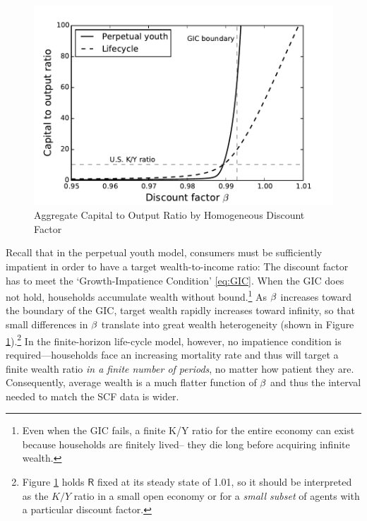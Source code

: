 \documentclass[12pt,titlepage]{econtex}
\begin{document}
\begin{figure}
  \caption{Aggregate Capital to Output Ratio by Homogeneous Discount Factor}
  \label{KYratioByBeta}
  \begin{center}
    \includegraphics{./Figures/KYratioByBeta}
  \end{center}
\end{figure}

Recall that in the perpetual youth model, consumers must be sufficiently impatient in order to have a target wealth-to-income ratio: The discount factor has to meet the `Growth-Impatience Condition' \eqref{eq:GIC}. When the GIC does not hold, households accumulate wealth without bound.\footnote{Even when the GIC fails, a finite K/Y ratio for the entire economy can exist because households are finitely lived-- they die long before acquiring infinite wealth.}  As $\beta$ increases toward the boundary of the GIC, target wealth rapidly increases toward infinity, so that small differences in $\beta$ translate into great wealth heterogeneity (shown in Figure \ref{KYratioByBeta}).\footnote{Figure \ref{KYratioByBeta} holds $\mathsf{R}$ fixed at its steady state of 1.01, so it should be interpreted as the $K/Y$ ratio in a small open economy or for a \textit{small subset} of agents with a particular discount factor.}  In the finite-horizon life-cycle model, however, no impatience condition is required---households face an increasing mortality rate and thus will target a finite wealth ratio \textit{in a finite number of periods}, no matter how patient they are. Consequently, average wealth is a much flatter function of $\beta$ and thus the interval needed to match the SCF data is wider.
\end{document}
